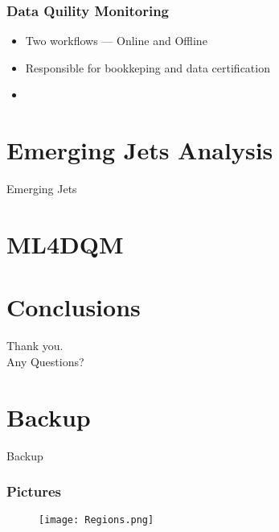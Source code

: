 \documentclass[9pt,aspectratio=169]{beamer}
\begin{document}
\begin{frame}
	\frametitle{Data Quility Monitoring}
	\begin{itemize}
		\item Two workflows --- Online and Offline
		\item Responsible for bookkeping and data certification
		\item
	\end{itemize}

\end{frame}

\section{Emerging Jets Analysis}

\begin{frame}{Emerging Jets}

\end{frame}

\section{ML4DQM}


\section{Conclusions}



\begin{frame}
	\begin{center}
		{\Huge Thank you.\\ \vspace{1cm} Any Questions?}
	\end{center}
\end{frame}


\appendix

\section{Backup}

\begin{frame}
	\begin{center}
		{\Huge Backup}
	\end{center}
\end{frame}

\begin{frame}
	\frametitle{Pictures}
	\begin{figure}
		\centering
		\texttt{[image: Regions.png]}
	\end{figure}
\end{frame}
\end{document}
